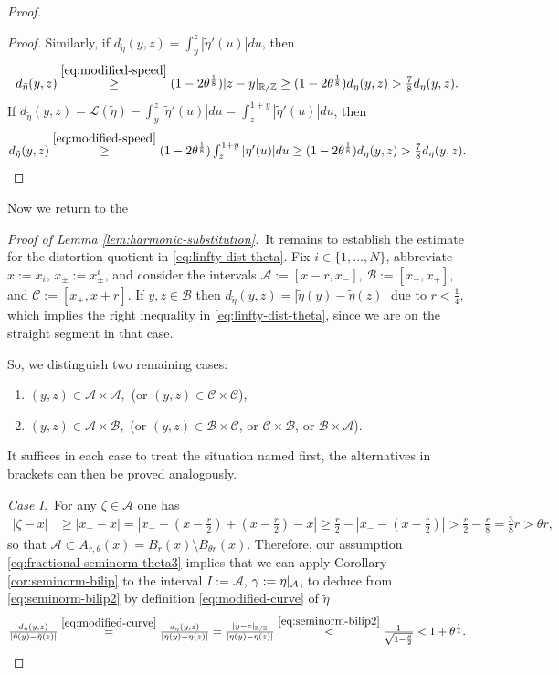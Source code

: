 \begin{proof}
\begin{proof}
Similarly, if $d_{\tilde{\eta}}(y,z)=\int_y^z|\tilde{\eta}'(u)|du$, then
$$
\textstyle
d_{\tilde{\eta}}(y,z)\overset{\eqref{eq:modified-speed}}{\ge}(1-2\theta^\frac18)
|z-y|_{\mathbb{R}/\mathbb{Z}}\ge
(1-2\theta^\frac18)
d_\eta(y,z)>\frac78 d_\eta(y,z).
$$
If $d_{\tilde{\eta}}(y,z)=\mathscr{L}(\tilde{\eta})-\int_y^z|\tilde{\eta}'(u)|du=
\int_z^{1+y}|\tilde{\eta}'(u)|du$, then
\[
\textstyle
d_{\tilde{\eta}}(y,z)\overset{\eqref{eq:modified-speed}}{\ge}(1-2\theta^\frac18)
\int_z^{1+y}|\eta'(u)|du\ge (1-2\theta^\frac18)d_\eta(y,z)>
\frac78 d_\eta(y,z).\qedhere
\]
\end{proof}
Now we return to the

\noindent
{\it Proof of Lemma \ref{lem:harmonic-substitution}.}\,
It remains to establish the estimate for the distortion quotient in
\eqref{eq:linfty-dist-theta}. Fix $i\in\{1,\ldots,N\}$, abbreviate
$x:=x_i$, $x_\pm:=x_\pm^i$, and consider the intervals
$\mathcal{A}:=[x-r,x_-]$, $\mathcal{B}:=[x_-,x_+]$, and $\mathcal{C}:=[x_+,x+r]$.
If $y,z\in \mathcal{B}$ 
then $d_{\tilde{\eta}}(y,z)=|\tilde{\eta}(y)-\tilde{\eta}(z)|$ due to $r<\frac14$,
which implies the right inequality in \eqref{eq:linfty-dist-theta},
since
we are on the straight segment in that case. 

So, we distinguish two remaining cases:
\begin{enumerate}
\item[\rm I.] $(y,z)\in \mathcal{A}\times \mathcal{A},$ (or $(y,z)\in 
\mathcal{C}\times \mathcal{C}$),
\item[\rm II.]
$(y,z)\in \mathcal{A}\times \mathcal{B},$ (or $(y,z)\in 
\mathcal{B}\times \mathcal{C}$, or  $\mathcal{C}
\times \mathcal{B}$, or $\mathcal{B}\times \mathcal{A}$).
\end{enumerate}
It suffices in each case to treat the situation named first, the alternatives in brackets
can then be proved analogously.

\noindent
{\it Case I.}\,
For any $\zeta\in \mathcal{A}$ one has
\begin{align*}
|\zeta-x|&\textstyle
\ge |x_- - x|=|x_- -(x-\frac{r}2)+(x-\frac{r}2)-x|\ge\frac{r}2-|x_- -(x-\frac{r}2)|
 >\frac{r}2 -\frac{r}8=\frac38 r>\theta r,
\end{align*}
so that $\mathcal{A}
\subset A_{r,\theta}(x)=B_r(x)\setminus B_{\theta r}(x)$. Therefore, our
assumption \eqref{eq:fractional-seminorm-theta3} implies that we
can apply
Corollary 
\ref{cor:seminorm-bilip} to the interval  $I:=\mathcal{A}$, $\gamma:=\eta|_\mathcal{A}$,
to deduce from \eqref{eq:seminorm-bilip2} 
by definition \eqref{eq:modified-curve} of $\tilde{\eta}$
\begin{equation}\label{eq:dist-A}
\textstyle
\frac{d_{\tilde{\eta}}(y,z)}{|\tilde{\eta}(y)-\tilde{\eta}(z)|}
\overset{\eqref{eq:modified-curve}}{=}
\frac{d_{\eta}(y,z)}{|\eta(y)-\eta(z)|}
=\frac{|y-z|_{\mathbb{R}/\mathbb{Z}}}{|\eta(y)-\eta(z)|}
\overset{\eqref{eq:seminorm-bilip2}}{<}
\frac1{\sqrt{1-\frac{\theta}2}}<1+\theta^\frac14.
\end{equation}


\end{proof}
